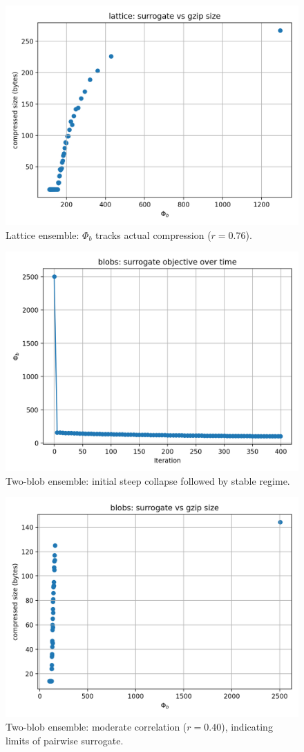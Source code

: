 \documentclass[11pt]{article}
\begin{document}
\begin{figure}[h!]
  \centering
  \includegraphics[width=0.7\linewidth]{figures/lattice_phib_vs_compressed.png}
  \caption{Lattice ensemble: $\Phi_b$ tracks actual compression ($r=0.76$).}
  \label{fig:lattice_corr}
\end{figure}

\begin{figure}[h!]
  \centering
  \includegraphics[width=0.7\linewidth]{figures/blobs_phib_vs_iter.png}
  \caption{Two-blob ensemble: initial steep collapse followed by stable regime.}
  \label{fig:blobs_iter}
\end{figure}

\begin{figure}[h!]
  \centering
  \includegraphics[width=0.7\linewidth]{figures/blobs_phib_vs_compressed.png}
  \caption{Two-blob ensemble: moderate correlation ($r=0.40$), indicating limits of pairwise surrogate.}
  \label{fig:blobs_corr}
\end{figure}
\end{document}
